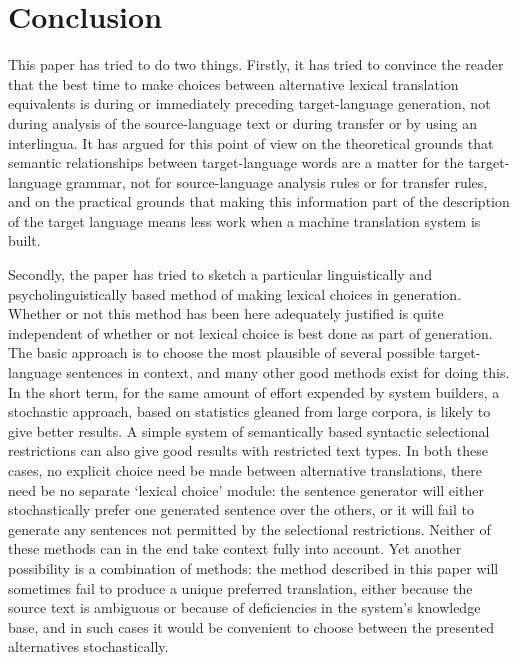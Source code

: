 \section{Conclusion}

This paper has tried to do two things.
Firstly, it has tried to convince the reader that the best time to make
choices between alternative lexical translation equivalents is during or
immediately preceding target-language generation, not during analysis of
the source-language text or during transfer or by using an interlingua.
It has argued for this point of view on the theoretical grounds that
semantic relationships between target-language words are a matter for
the target-language grammar, not for source-language analysis rules or
for transfer rules, and on the practical grounds that making this
information part of the description of the target language means less
work when a machine translation system is built.

Secondly, the paper has tried to sketch a particular linguistically and
psycholinguistically based method of making lexical choices in
generation. Whether or not this method has been here adequately
justified is quite independent of whether or not lexical choice is best
done as part of generation. The basic approach is to choose the most
plausible of several possible target-language sentences in context, and
many other good methods exist for doing this.
In the short term, for the same amount of effort expended by system
builders, a stochastic approach, based on statistics gleaned from large
corpora, is likely to give better results.
A simple system of semantically based syntactic selectional restrictions
can also give good results with restricted text types.
In both these cases, no explicit choice need be made between alternative
translations, there need be no separate `lexical choice' module: the
sentence generator will either stochastically prefer one generated
sentence over the others, or it will fail to generate any sentences not
permitted by the selectional restrictions.
Neither of these methods can in the end take context fully into account.
Yet another possibility is a combination of methods: the method
described in this paper will sometimes fail to produce a unique
preferred translation, either because the source text is ambiguous or
because of deficiencies in the system's knowledge base, and in such
cases it would be convenient to choose between the presented
alternatives stochastically.






